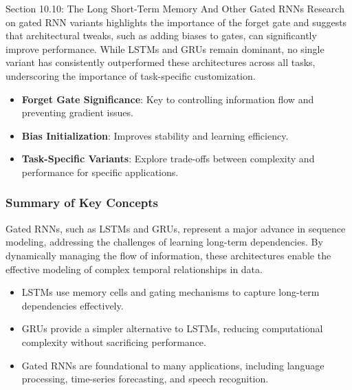 \begin{notes}{Section 10.10: The Long Short-Term Memory And Other Gated RNNs}
    Research on gated RNN variants highlights the importance of the forget gate and suggests that architectural tweaks, such as adding biases to gates, can significantly improve performance. While LSTMs and 
    GRUs remain dominant, no single variant has consistently outperformed these architectures across all tasks, underscoring the importance of task-specific customization.
    
    \begin{highlight}
        \begin{itemize}
            \item \textbf{Forget Gate Significance}: Key to controlling information flow and preventing gradient issues.
            \item \textbf{Bias Initialization}: Improves stability and learning efficiency.
            \item \textbf{Task-Specific Variants}: Explore trade-offs between complexity and performance for specific applications.
        \end{itemize}
    \end{highlight}
    
    \subsubsection*{Summary of Key Concepts}
    
    Gated RNNs, such as LSTMs and GRUs, represent a major advance in sequence modeling, addressing the challenges of learning long-term dependencies. By dynamically managing the flow of information, these 
    architectures enable the effective modeling of complex temporal relationships in data.
    
    \begin{highlight}
        \begin{itemize}
            \item LSTMs use memory cells and gating mechanisms to capture long-term dependencies effectively.
            \item GRUs provide a simpler alternative to LSTMs, reducing computational complexity without sacrificing performance.
            \item Gated RNNs are foundational to many applications, including language processing, time-series forecasting, and speech recognition.
        \end{itemize}
    \end{highlight}
\end{notes}

